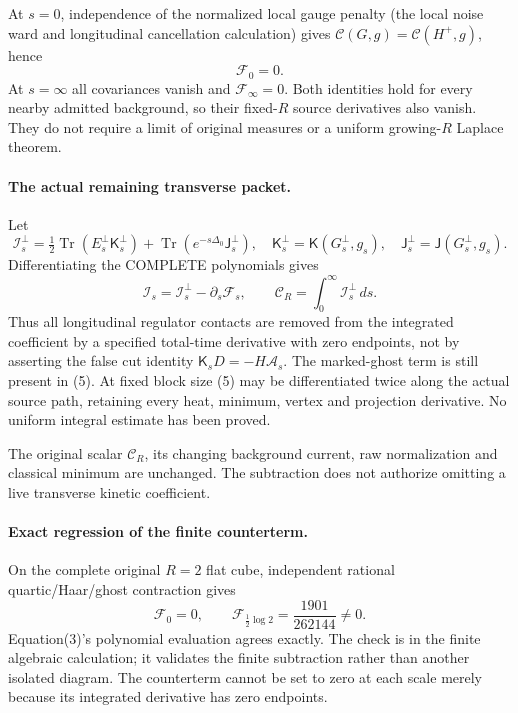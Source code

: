 \documentclass[11pt]{article}
\begin{document}
At $s=0$, independence of the normalized local gauge penalty (the local noise ward and longitudinal cancellation calculation)
gives $\mathcal C(G,g)=\mathcal C(H^+,g)$, hence
\[
 \mathcal F_0=0.
\]
At $s=\infty$ all covariances vanish and $\mathcal F_\infty=0$.
Both identities hold for every nearby admitted background, so their
fixed-$R$ source derivatives also vanish. They do not require a
limit of original measures or a uniform growing-$R$ Laplace theorem.

\paragraph{The actual remaining transverse packet.}
Let
\[
 \mathcal I_s^\perp=
 \tfrac12\operatorname{Tr}(E_s^\perp\mathsf K_s^\perp)
       +\operatorname{Tr}(e^{-s\Delta_0}\mathsf J_s^\perp),
 \quad
 \mathsf K_s^\perp=\mathsf K(G_s^\perp,g_s),\quad
 \mathsf J_s^\perp=\mathsf J(G_s^\perp,g_s).
\]
Differentiating the COMPLETE polynomials gives
\[
 \boxed{\mathcal I_s=\mathcal I_s^\perp-\partial_s\mathcal F_s,
 \qquad
 \mathcal C_R=\int_0^\infty\mathcal I_s^\perp\,ds.}               \tag{5}
\]
Thus all longitudinal regulator contacts are removed from the integrated
coefficient by a specified total-time derivative with zero endpoints,
not by asserting the false cut identity $\mathsf K_sD=-H\mathcal A_s$.
The marked-ghost term is still present in (5).
At fixed block size (5) may be differentiated twice along the actual
source path, retaining every heat, minimum, vertex and projection
derivative. No uniform integral estimate has been proved.

The original scalar $\mathcal C_R$, its changing background current,
raw normalization and classical minimum are unchanged. The subtraction
does not authorize omitting a live transverse kinetic coefficient.

\paragraph{Exact regression of the finite counterterm.}
On the complete original $R=2$ flat cube, independent rational
quartic/Haar/ghost contraction gives
\[
 \mathcal F_0=0,\qquad
 \mathcal F_{\frac12\log2}=\frac{1901}{262144}\ne0.
\]
Equation(3)'s polynomial evaluation agrees exactly. The check is in
the finite algebraic calculation; it validates the
finite subtraction rather than another isolated diagram.
The counterterm cannot be set to zero at each scale merely because
its integrated derivative has zero endpoints.
\end{document}
